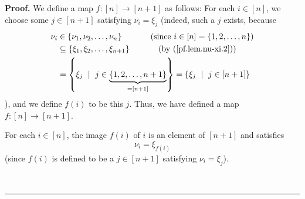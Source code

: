 \documentclass[numbers=enddot,12pt,final,onecolumn,notitlepage,english]{scrartcl}%
\theoremstyle{definition}
\newenvironment{proof}[1][Proof]{\noindent\textbf{#1.} }{\ \rule{0.5em}{0.5em}}
\newenvironment{verlong}{}{}
\begin{document}
\begin{verlong}
\begin{proof}
We define a map $f:\left[  n\right]  \rightarrow\left[  n+1\right]  $ as
follows: For each $i\in\left[  n\right]  $, we choose some $j\in\left[
n+1\right]  $ satisfying $\nu_{i}=\xi_{j}$ (indeed, such a $j$ exists,
because
\begin{align*}
\nu_{i}  &  \in\left\{  \nu_{1},\nu_{2},\ldots,\nu_{n}\right\}
\ \ \ \ \ \ \ \ \ \ \left(  \text{since }i\in\left[  n\right]  =\left\{
1,2,\ldots,n\right\}  \right) \\
&  \subseteq\left\{  \xi_{1},\xi_{2},\ldots,\xi_{n+1}\right\}
\ \ \ \ \ \ \ \ \ \ \left(  \text{by (\ref{pf.lem.nu-xi.2})}\right) \\
&  =\left\{  \xi_{j}\ \mid\ j\in\underbrace{\left\{  1,2,\ldots,n+1\right\}
}_{=\left[  n+1\right]  }\right\}  =\left\{  \xi_{j}\ \mid\ j\in\left[
n+1\right]  \right\}
\end{align*}
), and we define $f\left(  i\right)  $ to be this $j$. Thus, we have defined a
map $f:\left[  n\right]  \rightarrow\left[  n+1\right]  $.

For each $i\in\left[  n\right]  $, the image $f\left(  i\right)  $ of $i$ is
an element of $\left[  n+1\right]  $ and satisfies%
\begin{equation}
\nu_{i}=\xi_{f\left(  i\right)  } \label{pf.lem.nu-xi.def-f.2}%
\end{equation}
(since $f\left(  i\right)  $ is defined to be a $j\in\left[  n+1\right]  $
satisfying $\nu_{i}=\xi_{j}$).


\end{proof}
\end{verlong}
\end{document}
